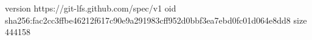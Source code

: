 version https://git-lfs.github.com/spec/v1
oid sha256:fac2cc3ffbe46212f617c90e9a291983cff952d0bbf3ea7ebd0fc01d064e8dd8
size 444158

